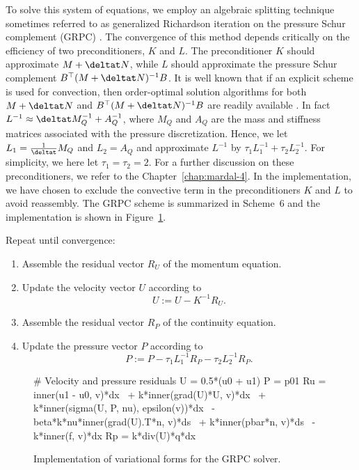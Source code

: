 To solve this system of equations, we employ an algebraic splitting
technique sometimes referred to as generalized Richardson iteration on
the pressure Schur complement (GRPC) \citep{Turek1999}. The
convergence of this method depends critically on the efficiency of two
preconditioners, $K$ and $L$. The preconditioner $K$ should
approximate $M + \deltat N$, while $L$ should approximate the
pressure Schur complement $B^{\top} (M + \deltat N)^{-1} B$. It is well
known that if an explicit scheme is used for convection, then
order-optimal solution algorithms for both $M + \deltat N$ and $B^{\top} (M
+ \deltat N)^{-1} B$ are readily available
\citep{CahouetChabard1988,Turek1999,MardalWinther2004,MardalWinther11}. In
fact $L^{-1} \approx \deltat M_Q^{-1} + A_Q^{-1}$, where $M_Q$ and
$A_Q$ are the mass and stiffness matrices associated with the pressure
discretization. Hence, we let $L_1=\frac{1}{\deltat} M_Q$ and
${L}_2=A_Q$ and approximate $L^{-1}$ by $\tau_1 L_1^{-1} + \tau_2
{L}_2^{-1}$. For simplicity, we here let $\tau_1 = \tau_2 = 2$.  For a
further discussion on these preconditioners, we refer to the
Chapter~\ref{chap:mardal-4}. In the implementation, we have chosen to
exclude the convective term in the preconditioners $K$ and $L$ to
avoid reassembly.  The GRPC scheme is summarized in Scheme~6 and the
implementation is shown in Figure~\ref{fig:grpc_code}.

{
\item
  Repeat until convergence:

  \begin{enumerate}
  \item
    Assemble the residual vector $R_U$ of the momentum equation.
  \item
    Update the velocity vector $U$ according to
    \begin{equation}\label{eq:grpc,1}
      U := U - K^{-1} R_U.
    \end{equation}
  \item
    Assemble the residual vector $R_P$ of the continuity equation.
  \item
    Update the pressure vector $P$ according to
    \begin{equation}\label{eq:grpc,2}
      P := P - \tau_1 L_1^{-1} R_P - \tau_2 {L}_2^{-1} R_P.
    \end{equation}
  \end{enumerate}
}

\begin{figure}
  \begin{center}
    \begin{python}
# Velocity and pressure residuals
U = 0.5*(u0 + u1)
P = p01
Ru = inner(u1 - u0, v)*dx \
   + k*inner(grad(U)*U, v)*dx \
   + k*inner(sigma(U, P, nu), epsilon(v))*dx \
   - beta*k*nu*inner(grad(U).T*n, v)*ds \
   + k*inner(pbar*n, v)*ds \
   - k*inner(f, v)*dx
Rp = k*div(U)*q*dx
    \end{python}
    \caption{Implementation of variational forms for the GRPC solver.}
    \label{fig:grpc_code}
  \end{center}
\end{figure}

